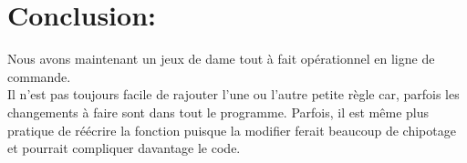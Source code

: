 \documentclass[10pt,a4paper]{report}
\begin{document}
\chapter*{Conclusion:}
Nous avons maintenant un jeux de dame tout à fait opérationnel en ligne de commande.\\
Il n'est pas toujours facile de rajouter l'une ou l'autre petite règle car, parfois les changements à faire sont dans tout le programme. Parfois, il est même plus pratique de réécrire la fonction puisque la modifier ferait beaucoup de chipotage et pourrait compliquer davantage le code.\\

\tableofcontents
\end{document}
